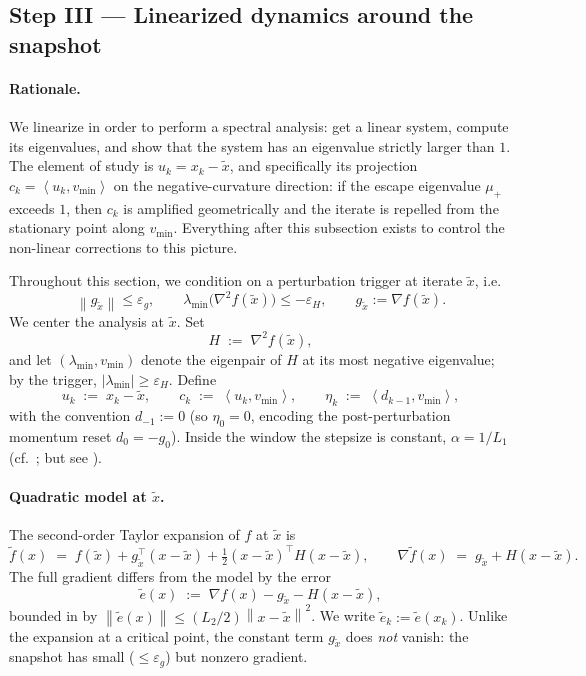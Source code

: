 \documentclass[11pt,a4paper]{article}
\theoremstyle{plain}
\theoremstyle{definition}
\newcommand{\norm}[1]{\left\|#1\right\|}
\newcommand{\inner}[2]{\left\langle #1,#2 \right\rangle}
\newcommand{\eps}{\varepsilon}
\newcommand{\epsg}{\eps_{g}}
\newcommand{\epsH}{\eps_{H}}
\newcommand{\grad}{\nabla}
\newcommand{\hess}{\nabla^{2}}
\newcommand{\Lone}{L_{1}}
\newcommand{\Ltwo}{L_{2}}
\newcommand{\snap}{\tilde{x}}
\newcommand{\vmin}{v_{\min}}
\newcommand{\lmin}{\lambda_{\min}}
\begin{document}
\subsection{Step III --- Linearized dynamics around the snapshot}
\label{sub:linearization}

\paragraph{Rationale.}
We linearize in order to perform a spectral analysis: get a linear system, compute
its eigenvalues, and show that the system has an eigenvalue strictly larger than
$1$. The element of study is $u_{k} = x_{k}-\snap$, and specifically its projection
$c_{k} = \inner{u_{k}}{\vmin}$ on the negative-curvature direction: if the
escape eigenvalue $\mu_{+}$ exceeds $1$, then $c_{k}$ is amplified geometrically and
the iterate is repelled from the stationary point along $\vmin$. Everything after
this subsection exists to control the non-linear corrections to this picture.

Throughout this section, we condition on a perturbation trigger at iterate
$\snap$, i.e.\
\[
\norm{g_{\snap}} \le \epsg, \qquad \lmin\!\bigl(\hess f(\snap)\bigr) \le -\epsH,
\qquad g_{\snap} := \grad f(\snap).
\]
We center the analysis at $\snap$. Set
\[
H \;:=\; \hess f(\snap),
\]
and let $(\lmin,\vmin)$ denote the eigenpair of $H$ at its most negative
eigenvalue; by the trigger, $|\lmin|\ge\epsH$. Define
\begin{equation}\label{eq:near-saddle-quants}
u_{k} \;:=\; x_{k}-\snap,
\qquad
c_{k} \;:=\; \inner{u_{k}}{\vmin},
\qquad
\eta_{k} \;:=\; \inner{d_{k-1}}{\vmin},
\end{equation}
with the convention $d_{-1}:=0$ (so $\eta_{0}=0$, encoding the
post-perturbation momentum reset $d_{0}=-g_{0}$). Inside the window the stepsize is
constant, $\alpha = 1/\Lone$ (cf.\ \Cref{algo:PNCG}; but see
).

\paragraph{Quadratic model at $\snap$.}
The second-order Taylor expansion of $f$ at $\snap$ is
\begin{equation}\label{eq:quadmodel}
\tilde f(x) \;=\; f(\snap) + g_{\snap}^{\top}(x-\snap)
   + \tfrac{1}{2}(x-\snap)^{\top}H(x-\snap),
\qquad
\grad\tilde f(x) \;=\; g_{\snap} + H(x-\snap).
\end{equation}
The full gradient differs from the model by the error
\begin{equation}\label{eq:tildee-def}
\tilde e(x) \;:=\; \grad f(x) - g_{\snap} - H(x-\snap),
\end{equation}
bounded in  by $\norm{\tilde e(x)}\le(\Ltwo/2)\norm{x-\snap}^{2}$.
We write $\tilde e_{k} := \tilde e(x_{k})$. Unlike the expansion at a critical
point, the constant term $g_{\snap}$ does \emph{not} vanish: the snapshot has
small ($\le\epsg$) but nonzero gradient.
\end{document}
